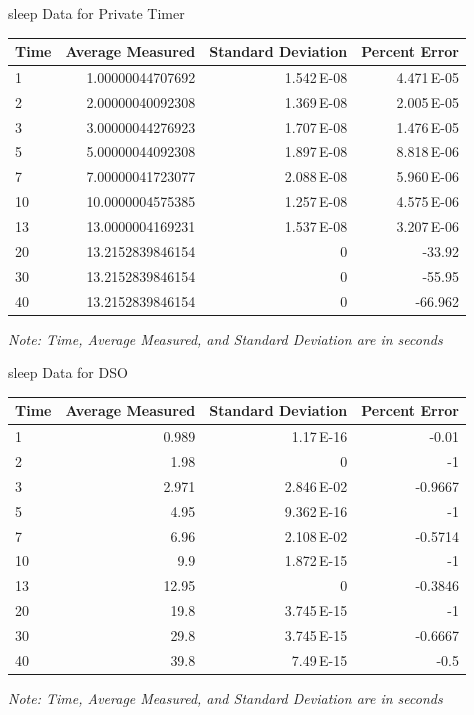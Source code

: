 \documentclass[pdf]{beamer}
\begin{document}
\begin{frame}{sleep Data for Private Timer}
  \begin{center}
    \begin{tabular}{lrrr}
      Time & Average Measured & Standard Deviation & Percent Error\\
      \hline
      1 & 1.00000044707692 & 1.542\,E-08 & 4.471\,E-05\\
      2 & 2.00000040092308 & 1.369\,E-08 & 2.005\,E-05\\
      3 & 3.00000044276923 & 1.707\,E-08 & 1.476\,E-05\\
      5 & 5.00000044092308 & 1.897\,E-08 & 8.818\,E-06\\
      7 & 7.00000041723077 & 2.088\,E-08 & 5.960\,E-06\\
      10 & 10.0000004575385 & 1.257\,E-08 & 4.575\,E-06\\
      13 & 13.0000004169231 & 1.537\,E-08 & 3.207\,E-06\\
      20 & 13.2152839846154 & 0 & -33.92\\
      30 & 13.2152839846154 & 0 & -55.95\\
      40 & 13.2152839846154 & 0 & -66.962\\
      \hline
    \end{tabular}
  \end{center}
  \small\emph{Note: Time, Average Measured, and Standard Deviation are in seconds}

\end{frame}

\begin{frame}{sleep Data for DSO}
  
  \begin{center}
    \begin{tabular}{lrrr}
      Time & Average Measured & Standard Deviation & Percent Error\\
      \hline
      1 & 0.989 & 1.17\,E-16 & -0.01\\
      2 & 1.98 & 0 & -1\\
      3 & 2.971 & 2.846\,E-02 & -0.9667\\
      5 & 4.95 & 9.362\,E-16 & -1\\
      7 & 6.96 & 2.108\,E-02 & -0.5714\\
      10 & 9.9 & 1.872\,E-15 & -1\\
      13 & 12.95 & 0 & -0.3846\\
      20 & 19.8 & 3.745\,E-15 & -1\\
      30 & 29.8 & 3.745\,E-15 & -0.6667\\
      40 & 39.8 & 7.49\,E-15 & -0.5\\
      \hline
    \end{tabular}
  \end{center}
  \small\emph{Note: Time, Average Measured, and Standard Deviation are in seconds}

\end{frame}
\end{document}
